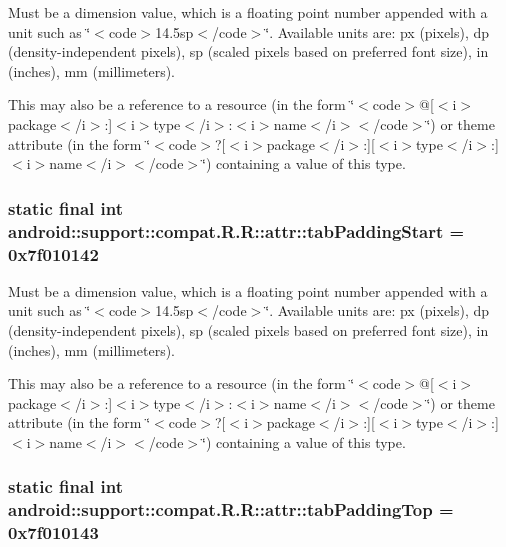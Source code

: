Must be a dimension value, which is a floating point number appended with a unit such as \char`\"{}$<$code$>$14.5sp$<$/code$>$\char`\"{}. Available units are: px (pixels), dp (density-independent pixels), sp (scaled pixels based on preferred font size), in (inches), mm (millimeters). 

This may also be a reference to a resource (in the form \char`\"{}$<$code$>$@\mbox{[}$<$i$>$package$<$/i$>$:\mbox{]}$<$i$>$type$<$/i$>$:$<$i$>$name$<$/i$>$$<$/code$>$\char`\"{}) or theme attribute (in the form \char`\"{}$<$code$>$?\mbox{[}$<$i$>$package$<$/i$>$:\mbox{]}\mbox{[}$<$i$>$type$<$/i$>$:\mbox{]}$<$i$>$name$<$/i$>$$<$/code$>$\char`\"{}) containing a value of this type. \hypertarget{classandroid_1_1support_1_1compat_1_1_r_1_1attr_f5529048213e17c8cf09dc3678eb5dd8}{
\subsubsection[{tabPaddingStart}]{\setlength{\rightskip}{0pt plus 5cm}static final int android::support::compat.R.R::attr::tabPaddingStart = 0x7f010142}}
\label{classandroid_1_1support_1_1compat_1_1_r_1_1attr_f5529048213e17c8cf09dc3678eb5dd8}


Must be a dimension value, which is a floating point number appended with a unit such as \char`\"{}$<$code$>$14.5sp$<$/code$>$\char`\"{}. Available units are: px (pixels), dp (density-independent pixels), sp (scaled pixels based on preferred font size), in (inches), mm (millimeters). 

This may also be a reference to a resource (in the form \char`\"{}$<$code$>$@\mbox{[}$<$i$>$package$<$/i$>$:\mbox{]}$<$i$>$type$<$/i$>$:$<$i$>$name$<$/i$>$$<$/code$>$\char`\"{}) or theme attribute (in the form \char`\"{}$<$code$>$?\mbox{[}$<$i$>$package$<$/i$>$:\mbox{]}\mbox{[}$<$i$>$type$<$/i$>$:\mbox{]}$<$i$>$name$<$/i$>$$<$/code$>$\char`\"{}) containing a value of this type. \hypertarget{classandroid_1_1support_1_1compat_1_1_r_1_1attr_1fa61b0b7fb967dbe9de5583cc6274dd}{
\subsubsection[{tabPaddingTop}]{\setlength{\rightskip}{0pt plus 5cm}static final int android::support::compat.R.R::attr::tabPaddingTop = 0x7f010143}}
\label{classandroid_1_1support_1_1compat_1_1_r_1_1attr_1fa61b0b7fb967dbe9de5583cc6274dd}


